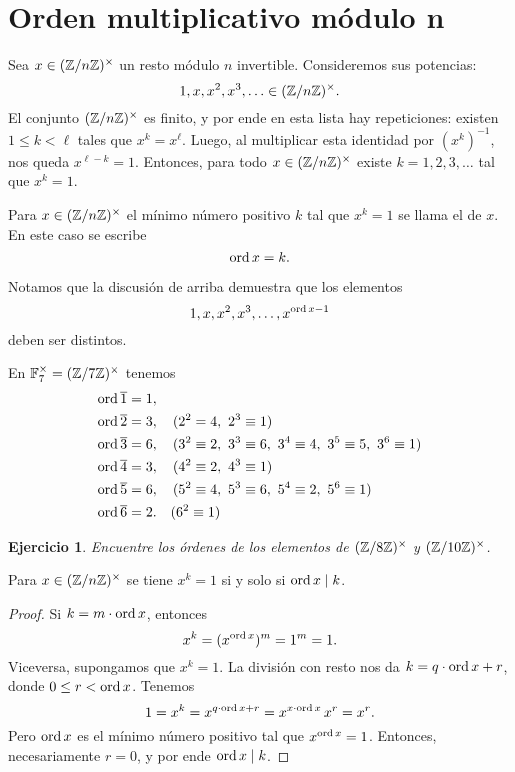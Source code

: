 \documentclass{article}
\theoremstyle{plain}
\newtheorem{ejerc}{Ejercicio}
\begin{document}
\section{Orden multiplicativo módulo n}

Sea $x \in (\mathbb{Z}/n\mathbb{Z})^\times$ un resto módulo $n$ invertible. Consideremos sus
potencias:
$$1, x, x^2, x^3, \ldots \in (\mathbb{Z}/n\mathbb{Z})^\times.$$
El conjunto $(\mathbb{Z}/n\mathbb{Z})^\times$ es finito, y por ende en esta lista hay
repeticiones: existen $1 \le k < \ell$ tales que $x^k = x^\ell$. Luego, al
multiplicar esta identidad por $(x^k)^{-1}$, nos queda $x^{\ell-k} =
1$. Entonces, para todo $x \in (\mathbb{Z}/n\mathbb{Z})^\times$ existe $k = 1,2,3,\ldots$ tal
que $x^k = 1$.

\begin{definicion}
  Para $x \in (\mathbb{Z}/n\mathbb{Z})^\times$ el mínimo número positivo $k$ tal que $x^k = 1$
  se llama el  de $x$. En este caso se escribe
  $$\operatorname{ord} x = k.$$
\end{definicion}

Notamos que la discusión de arriba demuestra que los elementos
$$1, x, x^2, x^3, \ldots, x^{\operatorname{ord} x-1}$$
deben ser distintos.

\begin{ejemplo}
  En $\mathbb{F}_7^\times = (\mathbb{Z}/7\mathbb{Z})^\times$ tenemos
  \begin{align*}
    \operatorname{ord} \overline{1} & = 1,\\
    \operatorname{ord} \overline{2} & = 3, \quad (2^2 = 4, ~ 2^3 \equiv 1)\\
    \operatorname{ord} \overline{3} & = 6, \quad (3^2 \equiv 2, ~ 3^3 \equiv 6, ~ 3^4 \equiv 4, ~ 3^5 \equiv 5, ~ 3^6 \equiv 1)\\
    \operatorname{ord} \overline{4} & = 3, \quad (4^2 \equiv 2, ~ 4^3 \equiv 1)\\
    \operatorname{ord} \overline{5} & = 6, \quad (5^2 \equiv 4, ~ 5^3 \equiv 6, ~ 5^4 \equiv 2, ~ 5^6 \equiv 1)\\
    \operatorname{ord} \overline{6} & = 2. \quad (6^2 \equiv 1) \qedhere
  \end{align*}
\end{ejemplo}

\begin{ejerc}
  Encuentre los órdenes de los elementos de $(\mathbb{Z}/8\mathbb{Z})^\times$ y
  $(\mathbb{Z}/10\mathbb{Z})^\times$.
\end{ejerc}

\begin{observacion}
  Para $x \in (\mathbb{Z}/n\mathbb{Z})^\times$ se tiene $x^k = 1$ si y solo si
  $\operatorname{ord} x \mid k$.

  \begin{proof}
    Si $k = m\cdot \operatorname{ord} x$, entonces
    $$x^k = (x^{\operatorname{ord} x})^m = 1^m = 1.$$
    Viceversa, supongamos que $x^k = 1$. La división con resto nos da
    $k = q\cdot \operatorname{ord} x + r$, donde $0 \le r < \operatorname{ord} x$. Tenemos
    $$1 = x^k = x^{q\cdot \operatorname{ord} x + r} = x^{x\cdot \operatorname{ord} x}\,x^r = x^r.$$
    Pero $\operatorname{ord} x$ es el mínimo número positivo tal que
    $x^{\operatorname{ord} x} = 1$. Entonces, necesariamente $r = 0$, y por ende
    $\operatorname{ord} x \mid k$.
  \end{proof}
\end{observacion}
\end{document}
